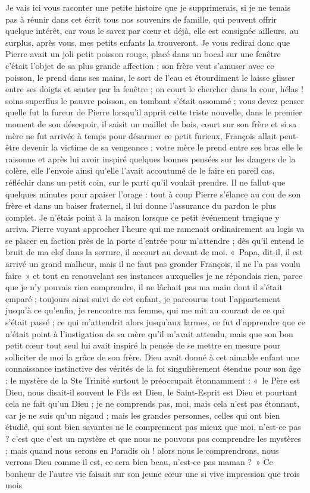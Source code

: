 \documentclass[11pt,a4paper]{report}
\begin{document}
Je vais ici vous raconter une petite histoire que je supprimerais, si je ne tenais pas à réunir dans cet écrit tous nos souvenirs de famille, qui peuvent offrir quelque intérêt, car vous le savez par cœur et déjà, elle est consignée ailleurs, au surplus, après vous, mes petits enfants la trouveront. Je vous redirai donc que Pierre avait un joli petit poisson rouge, placé dans un bocal sur une fenêtre c'était l'objet de sa plus grande affection ; son frère veut s'amuser avec ce poisson, le prend dans ses mains, le sort de l'eau et étourdiment le laisse glisser entre ses doigts et sauter par la fenêtre ; on court le chercher dans la cour, hélas ! soins superflus le pauvre poisson, en tombant s'était assommé ; vous devez penser quelle fut la fureur de Pierre lorsqu'il apprit cette triste nouvelle, dans le premier moment de son désespoir, il saisit un maillet de bois, court sur son frère et si sa mère ne fut arrivée à temps pour désarmer ce petit furieux, François allait peut-être devenir la victime de sa vengeance ; votre mère le prend entre ses bras elle le raisonne et après lui avoir inspiré quelques bonnes pensées sur les dangers de la colère, elle l'envoie ainsi qu'elle l'avait accoutumé de le faire en pareil cas, réfléchir dans un petit coin, sur le parti qu'il voulait prendre. Il ne fallut que quelques minutes pour apaiser l'orage : tout à coup Pierre s'élance au cou de son frère et dans un baiser fraternel, il lui donne l'assurance du pardon le plus complet. Je n'étais point à la maison lorsque ce petit événement tragique y arriva. Pierre voyant approcher l'heure qui me ramenait ordinairement au logis va se placer en faction près de la porte d'entrée pour m'attendre ; dès qu'il entend le bruit de ma clef dans la serrure, il accourt au devant de moi. «~Papa, dit-il, il est arrivé un grand malheur, mais il ne faut pas gronder François, il ne l'a pas voulu faire~» et tout en renouvelant ses instances auxquelles je ne répondais rien, parce que je n'y pouvais rien comprendre, il ne lâchait pas ma main dont il s'était emparé ; toujours ainsi suivi de cet enfant, je parcourus tout l'appartement jusqu'à ce qu'enfin, je rencontre ma femme, qui me mit au courant de ce qui s'était passé ; ce qui m'attendrit alors jusqu'aux larmes, ce fut d'apprendre que ce n'était point à l'instigation de sa mère qu'il m'avait attendu, mais que son bon petit cœur tout seul lui avait inspiré la pensée de se mettre en mesure pour solliciter de moi la grâce de son frère. Dieu avait donné à cet aimable enfant une connaissance instinctive des vérités de la foi singulièrement étendue pour son âge ; le mystère de la Ste Trinité surtout le préoccupait étonnamment : «~le Père est Dieu, nous disait-il souvent le Fils est Dieu, le Saint-Esprit est Dieu et pourtant cela ne fait qu'un Dieu ; je ne comprends pas, moi, mais cela n'est pas étonnant, car je ne suis qu'un nigaud ; mais les grandes personnes, celles qui ont bien étudié, qui sont bien savantes ne le comprennent pas mieux que moi, n'est-ce pas ? c'est que c'est un mystère et que nous ne pouvons pas comprendre les mystères ; mais quand nous serons en Paradis oh ! alors nous le comprendrons, nous verrons Dieu comme il est, ce sera bien beau, n'est-ce pas maman ?~» Ce bonheur de l'autre vie faisait sur son jeune cœur une si vive impression que trois mois 
\end{document}
